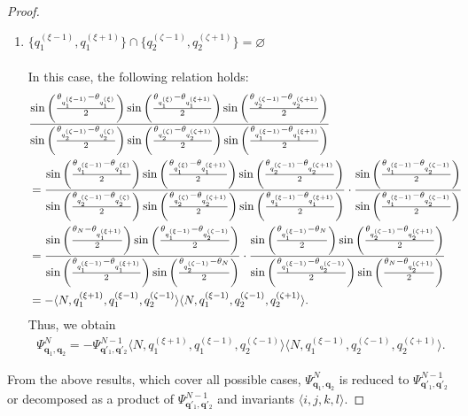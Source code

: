 \documentclass[10pt,a4paper]{amsart}
\begin{document}
\begin{proof}
\begin{enumerate}
\item[\textit{Case.6:}] $\{{q_1^{(\xi-1)}},{q_1^{(\xi+1)}}\} \cap \{{q_2^{(\zeta-1)}}, {q_2^{(\zeta+1)}}\} = \varnothing$ 
\\ \\
%
In this case, the following relation holds:
\begin{align}
    &\frac{\sin\left( \frac{\theta_{q_1^{(\xi-1)}} - \theta_{q_1^{(\xi)}}}{2} \right)\sin\left( \frac{\theta_{q_1^{(\xi)}} - \theta_{q_1^{(\xi+1)}}}{2} \right)\sin\left( \frac{\theta_{q_2^{(\zeta-1)}} - \theta_{q_2^{(\zeta+1)}}}{2} \right)}
   {\sin\left( \frac{\theta_{q_2^{(\zeta-1)}} - \theta_{q_2^{(\zeta)}}}{2} \right)\sin\left( \frac{\theta_{q_2^{(\zeta)}} - \theta_{q_2^{(\zeta+1)}}}{2} \right)\sin\left( \frac{\theta_{q_1^{(\xi-1)}} - \theta_{q_1^{(\xi+1)}}}{2} \right)}\cr
    &=\frac{\sin\left( \frac{\theta_{q_1^{(\xi-1)}} - \theta_{q_1^{(\xi)}}}{2} \right)\sin\left( \frac{\theta_{q_1^{(\xi)}} - \theta_{q_1^{(\xi+1)}}}{2} \right)\sin\left( \frac{\theta_{q_2^{(\zeta-1)}} - \theta_{q_2^{(\zeta+1)}}}{2} \right)}
   {\sin\left( \frac{\theta_{q_2^{(\zeta-1)}} - \theta_{q_2^{(\zeta)}}}{2} \right)\sin\left( \frac{\theta_{q_2^{(\zeta)}} - \theta_{q_2^{(\zeta+1)}}}{2} \right)\sin\left( \frac{\theta_{q_1^{(\xi-1)}} - \theta_{q_1^{(\xi+1)}}}{2} \right)}
   \cdot \frac{\sin\left( \frac{\theta_{q_1^{(\xi-1)}} - \theta_{q_2^{(\zeta-1)}}}{2} \right)}{\sin\left( \frac{\theta_{q_1^{(\xi-1)}} - \theta_{q_2^{(\zeta-1)}}}{2} \right)}\cr
    &=\frac{\sin\left( \frac{\theta_{N} - \theta_{q_1^{(\xi+1)}}}{2} \right)\sin\left( \frac{\theta_{q_1^{(\xi-1)}} - \theta_{q_2^{(\zeta-1)}}}{2} \right)}{\sin\left( \frac{\theta_{q_1^{(\xi-1)}} - \theta_{q_1^{(\xi+1)}}}{2} \right)\sin\left( \frac{\theta_{q_2^{(\zeta-1)}} - \theta_{N}}{2} \right)}\cdot
    \frac{\sin\left( \frac{\theta_{q_1^{(\xi-1)}} - \theta_{N}}{2} \right)\sin\left( \frac{\theta_{q_2^{(\zeta-1)}} - \theta_{q_2^{(\zeta+1)}}}{2} \right)}{\sin\left( \frac{\theta_{q_1^{(\xi-1)}} - \theta_{q_2^{(\zeta-1)}}}{2} \right)\sin\left( \frac{\theta_{N} - \theta_{q_2^{(\zeta+1)}}}{2} \right)}
    \cr
    &=-\langle N, q_1^{(\xi+1)}, q_1^{(\xi-1)}, q_2^{(\zeta-1)}\rangle\langle N, q_1^{(\xi-1)}, q_2^{(\zeta-1)}, q_2^{(\zeta+1)}\rangle.
\end{align}
Thus, we obtain
\begin{align}
    \Psi^N_{\bm{q}_1, \bm{q}_2}= -\Psi^{N-1}_{\bm{q}'_1, \bm{q}'_2}
    \langle N, q_1^{(\xi+1)}, q_1^{(\xi-1)}, q_2^{(\zeta-1)}\rangle\langle N, q_1^{(\xi-1)}, q_2^{(\zeta-1)}, q_2^{(\zeta+1)}\rangle.
\end{align}
\end{enumerate}
%
From the above results, which cover all possible cases,  $\Psi^N_{\bm{q}_1, \bm{q}_2}$ is reduced to $\Psi^{N-1}_{\bm{q}'_1, \bm{q}'_2}$ or decomposed as a product of $\Psi^{N-1}_{\bm{q}'_1, \bm{q}'_2}$ and invariants $\langle  i,j,k,l\rangle$.
\end{proof}
\end{document}
